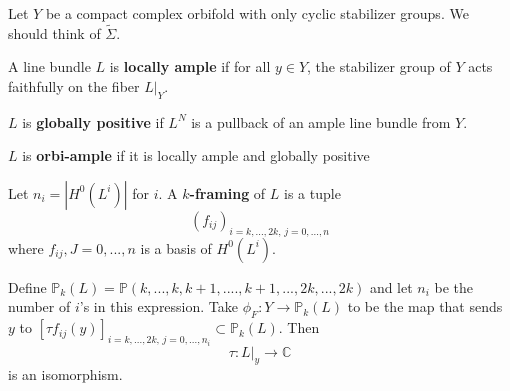 Let $Y$ be a compact complex orbifold with only cyclic stabilizer groups. We should think of $\tilde{\Sigma}$.

\begin{definition}

A line bundle $L$ is \textbf{locally ample} if for all $y\in Y$, the stabilizer group of $Y$ acts faithfully on the fiber $L|_Y$.

\end{definition}

\begin{definition}

$L$ is \textbf{globally positive} if $L^N$ is a pullback of an ample line bundle from $Y$.

\end{definition}

\begin{definition}

$L$ is \textbf{orbi-ample} if it is locally ample and globally positive

\end{definition}

\begin{definition}

Let $n_i = |H^0(L^i)|$ for $i$. A \textbf{$k$-framing} of $L$ is a tuple
\[
\left(f_{ij}\right)_{i=k,...,2k, \,j=0,...,n}
\]
where $f_{ij}, J=0,...,n$ is a basis of $H^0(L^i)$.

\end{definition}

\begin{theorem}

Define $\mathbb{P}_k(L)=\mathbb{P}(k,...,k, k+1,....,k+1,..., 2k, ...,2k)$ and let $n_i$ be the number of $i$'s in this expression. Take $\phi_F: Y\to \mathbb{P}_k(L)$ to be the map that sends $y$ to $[\tau f_{ij}(y)]_{i=k,..., 2k, \, j=0,...,n_i}\subset \mathbb{P}_k(L)$. Then
\[
\tau: L|_y \to \mathbb{C}
\]
is an isomorphism.

\end{theorem}